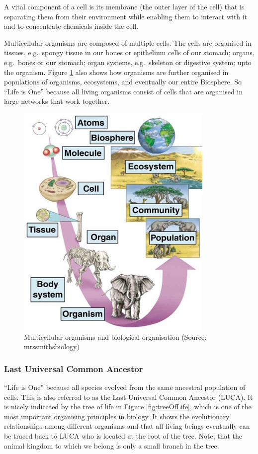 \documentclass[
  11pt,
]{book}
\begin{document}
A vital component of a cell is its membrane (the outer layer of the cell) that is separating them from their environment while enabling them to interact with it and to concentrate chemicals inside the cell.

Multicellular organisms are composed of multiple cells. The cells are organised in
tissues, e.g.~spongy tissue in our bones or epithelium cells of our stomach; organs, e.g.~bones or our stomach; organ systems, e.g.~skeleton or digestive system; upto the organism. Figure \ref{fig:multiCellular} also shows how organisms are further organised in populations of organisms, ecosystems, and eventually our entire Biosphere. So ``Life is One'' because all living organisms consist of cells that are organised in large networks that work together.

\begin{figure}

{\centering \includegraphics[width=0.3\linewidth]{./figs/organisationMulticellular} 

}

\caption{Multicellular organisms and biological organisation (Source: mrssmithsbiology)}\label{fig:multiCellular}
\end{figure}

\pagebreak

\hypertarget{last-universal-common-ancestor}{%
\subsubsection{Last Universal Common Ancestor}\label{last-universal-common-ancestor}}

``Life is One'' because all species evolved from the same ancestral population of cells.
This is also referred to as the Last Universal Common Ancestor (LUCA). It is nicely indicated by the tree of life in Figure \ref{fig:treeOfLife}, which is one of the most important organising principles in biology. It shows the evolutionary relationships among different organisms and that all living beings eventually can be traced back to LUCA who is located at the root of the tree. Note, that the animal kingdom to which we belong is only a small branch in the tree.
\end{document}
